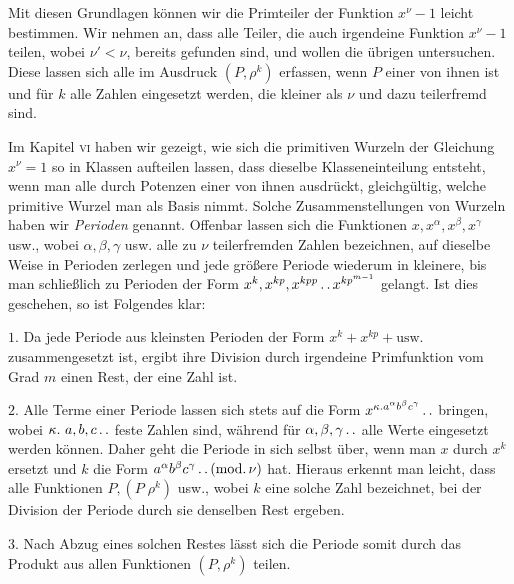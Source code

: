 \clearpage
{}
Mit diesen Grundlagen können wir die Primteiler der Funktion $x^\nu-1$ leicht bestimmen. Wir nehmen an, dass alle Teiler, die auch irgendeine Funktion
$x^\nu-1$ teilen, wobei $\nu'<\nu$, bereits gefunden sind, und wollen die übrigen untersuchen. Diese lassen sich alle im Ausdruck $(P,\rho^k)$ erfassen, wenn $P$ einer von ihnen ist und für $k$ alle Zahlen eingesetzt werden, die kleiner als $\nu$ und dazu teilerfremd sind.

Im Kapitel \textsc{vi} haben wir gezeigt, wie sich die primitiven Wurzeln der Gleichung $x^\nu=1$ so in Klassen aufteilen lassen, dass dieselbe Klasseneinteilung entsteht, wenn man alle durch Potenzen einer von ihnen ausdrückt, gleichgültig, welche primitive Wurzel man als Basis nimmt. Solche Zusammenstellungen von Wurzeln haben wir \emph{Perioden} genannt. Offenbar lassen sich die Funktionen $x,x^\alpha,x^\beta,x^\gamma$ usw., wobei $\alpha,\beta,\gamma$ usw. alle zu $\nu$ teilerfremden Zahlen bezeichnen, auf dieselbe Weise in Perioden zerlegen und jede größere Periode wiederum in kleinere, bis man schließlich zu Perioden der Form $x^k,x^{kp},x^{kpp}\mathinner{.\,.} x^{kp^{m-1}}$ gelangt. Ist dies geschehen, so ist Folgendes klar:

$1$. Da jede Periode aus kleinsten Perioden der Form $x^k+x^{kp}+\text{usw.}$ zusammengesetzt ist, ergibt ihre Division durch irgendeine Primfunktion vom Grad $m$ einen Rest, der eine Zahl ist.

$2$. Alle Terme einer Periode lassen sich stets auf die Form $x^{\kappa\mathbin{.} a^\alpha b^\beta c^\gamma}\mathinner{.\,.}$ bringen, wobei $\kappa.\ a,b,c\mathinner{.\,.}$ feste Zahlen sind, während für $\alpha,\beta,\gamma\mathinner{.\,.}$ alle Werte eingesetzt werden können. Daher geht die Periode in sich selbst über, wenn man $x$ durch $x^k$ ersetzt und $k$ die Form $a^\alpha b^\beta c^\gamma\mathinner{.\,.}(\mathrm{mod.}\,\nu)$ hat. Hieraus erkennt man leicht, dass alle Funktionen $P,(P\;\rho^k)$ usw., wobei $k$ eine solche Zahl bezeichnet, bei der Division der Periode durch sie denselben Rest ergeben.

$3$. Nach Abzug eines solchen Restes lässt sich die Periode somit durch das Produkt aus allen Funktionen $(P,\rho^k)$ teilen.
